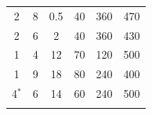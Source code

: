 \begin{table}[hbt]
\begin{subtable}{0.5\linewidth}
\begin{tabular}{cccccc}
			\hline
	2	&8	&0.5	&40	&360	&470	\\
	2	&6	&2	&40	&360	&430	\\
	1	&4	&12	&70	&120	&500	\\
	1	&9	&18	&80	&240	&400	\\
	4$^*$	&6	&14	&60	&240	&500	\\
			\hline
			\hline
			\\
		\end{tabular}
	\end{subtable}
\end{table}

